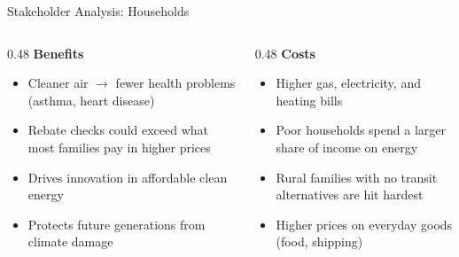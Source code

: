 \documentclass[9pt,english,aspectratio=169]{beamer}
\begin{document}
\begin{frame}{Stakeholder Analysis: Households}

  \begin{columns}[T]
    \begin{column}{0.48\textwidth}
      \textbf{\textcolor{green!60!black}{Benefits}}
      \begin{itemize}\small
        \item Cleaner air $\rightarrow$ fewer health problems (asthma, heart disease)
        \item Rebate checks could exceed what most families pay in higher prices
        \item Drives innovation in affordable clean energy
        \item Protects future generations from climate damage
      \end{itemize}
    \end{column}
    \begin{column}{0.48\textwidth}
      \textbf{\textcolor{vermillion}{Costs}}
      \begin{itemize}\small
        \item Higher gas, electricity, and heating bills
        \item Poor households spend a larger share of income on energy
        \item Rural families with no transit alternatives are hit hardest
        \item Higher prices on everyday goods (food, shipping)
      \end{itemize}
    \end{column}
  \end{columns}

\end{frame}
\end{document}
